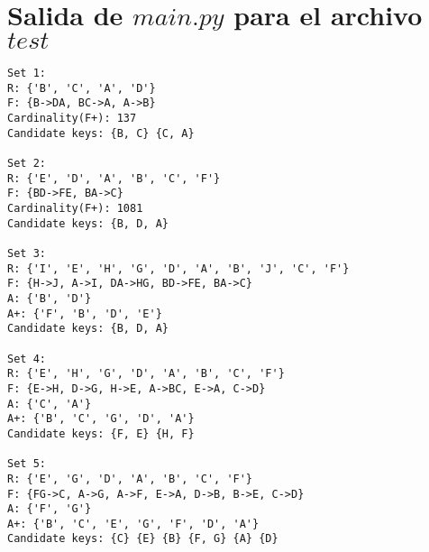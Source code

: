 \documentclass[a4paper]{report}
\begin{document}
\section*{Salida de $main.py$ para el archivo $test$}
\begin{verbatim}
Set 1:
R: {'B', 'C', 'A', 'D'}
F: {B->DA, BC->A, A->B}
Cardinality(F+): 137
Candidate keys: {B, C} {C, A} 

Set 2:
R: {'E', 'D', 'A', 'B', 'C', 'F'}
F: {BD->FE, BA->C}
Cardinality(F+): 1081
Candidate keys: {B, D, A} 

Set 3:
R: {'I', 'E', 'H', 'G', 'D', 'A', 'B', 'J', 'C', 'F'}
F: {H->J, A->I, DA->HG, BD->FE, BA->C}
A: {'B', 'D'}
A+: {'F', 'B', 'D', 'E'}
Candidate keys: {B, D, A} 

Set 4:
R: {'E', 'H', 'G', 'D', 'A', 'B', 'C', 'F'}
F: {E->H, D->G, H->E, A->BC, E->A, C->D}
A: {'C', 'A'}
A+: {'B', 'C', 'G', 'D', 'A'}
Candidate keys: {F, E} {H, F} 

Set 5:
R: {'E', 'G', 'D', 'A', 'B', 'C', 'F'}
F: {FG->C, A->G, A->F, E->A, D->B, B->E, C->D}
A: {'F', 'G'}
A+: {'B', 'C', 'E', 'G', 'F', 'D', 'A'}
Candidate keys: {C} {E} {B} {F, G} {A} {D} 
\end{verbatim}
\end{document}
